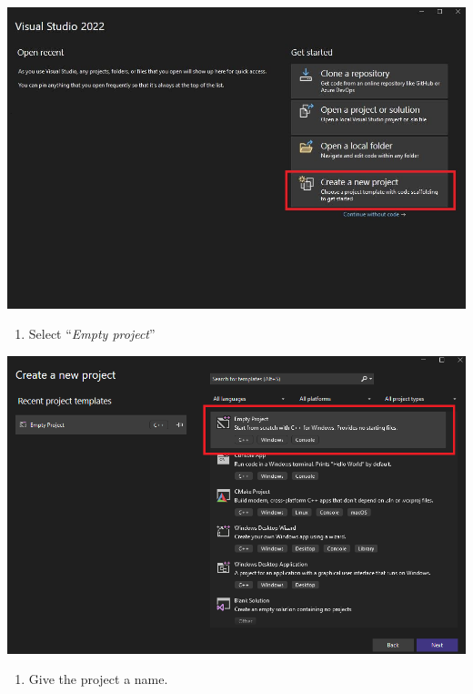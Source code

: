 \documentclass[../ro-fa-lab.tex]{subfiles}
\begin{document}
\includegraphics[width=\textwidth]{../Resources/lab0/create_project1.png}

\begin{enumerate}
\def\labelenumi{\arabic{enumi}.}
\setcounter{enumi}{1}
\item
      Select ``\emph{Empty project}''
\end{enumerate}

\includegraphics[width=\textwidth]{../Resources/lab0/create_project2.png}

\begin{enumerate}
\def\labelenumi{\arabic{enumi}.}
\setcounter{enumi}{2}
\item
      Give the project a name.
\end{enumerate}
\end{document}
